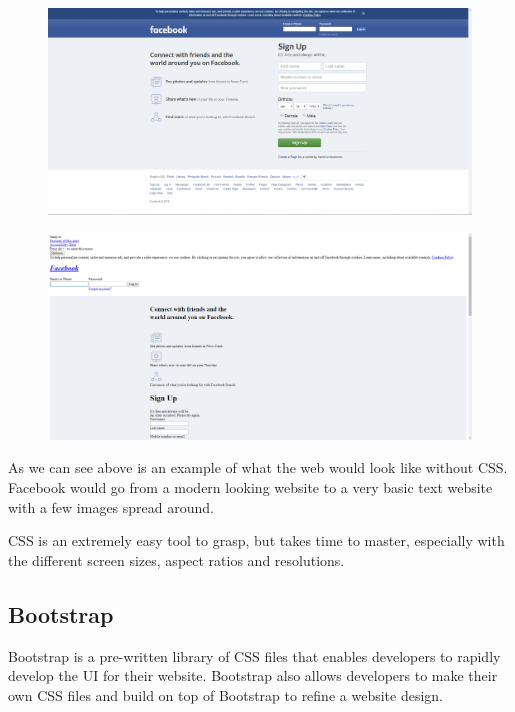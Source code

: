 \begin{figure}[H]
    \centering
    \begin{minipage}{.50\textwidth}
      \centering
      \includegraphics[width=.9\linewidth]{img/facebookCSS.PNG}
      \label{fig:aboutPC}
    \end{minipage}%
    \begin{minipage}{.50\textwidth}
      \centering
      \includegraphics[width=.9\linewidth]{img/facebookNoCSS.PNG}
      \label{fig:aboutMobile}
    \end{minipage}
\end{figure}

As we can see above is an example of what the web would look like without CSS. Facebook would go from a modern looking website to a very basic text website with a few images spread around.

CSS is an extremely easy tool to grasp, but takes time to master, especially with the different screen sizes, aspect ratios and resolutions.

\subsection{Bootstrap}
Bootstrap is a pre-written library of CSS files that enables developers to rapidly develop the UI for their website. Bootstrap also allows developers to make their own CSS files and build on top of Bootstrap to refine a website design.

